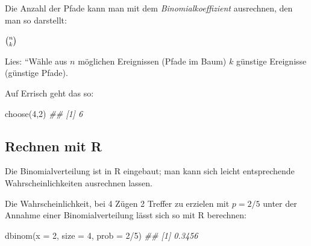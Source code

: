 \documentclass[
  a4paper,
  DIV=11]{scrreprt}
\newenvironment{Shaded}{\begin{snugshade}}{\end{snugshade}}
\newcommand{\AttributeTok}[1]{\textcolor[rgb]{0.40,0.45,0.13}{#1}}
\newcommand{\DecValTok}[1]{\textcolor[rgb]{0.68,0.00,0.00}{#1}}
\newcommand{\DocumentationTok}[1]{\textcolor[rgb]{0.37,0.37,0.37}{\textit{#1}}}
\newcommand{\FunctionTok}[1]{\textcolor[rgb]{0.28,0.35,0.67}{#1}}
\newcommand{\NormalTok}[1]{\textcolor[rgb]{0.00,0.23,0.31}{#1}}
\newcommand{\SpecialCharTok}[1]{\textcolor[rgb]{0.37,0.37,0.37}{#1}}
\theoremstyle{definition}
\theoremstyle{remark}
\begin{document}
Die Anzahl der Pfade kann man mit dem \emph{Binomialkoeffizient}
ausrechnen, den man so darstellt:

\(\tbinom{n}{k}\)

Lies: ``Wähle aus \(n\) möglichen Ereignissen (Pfade im Baum) \(k\)
günstige Ereignisse (günstige Pfade).

Auf Errisch geht das so:

\begin{Shaded}
\begin{Highlighting}[]
\FunctionTok{choose}\NormalTok{(}\DecValTok{4}\NormalTok{,}\DecValTok{2}\NormalTok{)}
\DocumentationTok{\#\# [1] 6}
\end{Highlighting}
\end{Shaded}

\hypertarget{rechnen-mit-r}{%
\subsection{Rechnen mit R}\label{rechnen-mit-r}}

Die Binomialverteilung ist in R eingebaut; man kann sich leicht
entsprechende Wahrscheinlichkeiten ausrechnen lassen.

Die Wahrscheinlichkeit, bei 4 Zügen 2 Treffer zu erzielen mit \(p=2/5\)
unter der Annahme einer Binomialverteilung lässt sich so mit R
berechnen:

\begin{Shaded}
\begin{Highlighting}[]
\FunctionTok{dbinom}\NormalTok{(}\AttributeTok{x =} \DecValTok{2}\NormalTok{, }\AttributeTok{size =} \DecValTok{4}\NormalTok{, }\AttributeTok{prob =} \DecValTok{2}\SpecialCharTok{/}\DecValTok{5}\NormalTok{)}
\DocumentationTok{\#\# [1] 0.3456}
\end{Highlighting}
\end{Shaded}
\end{document}
